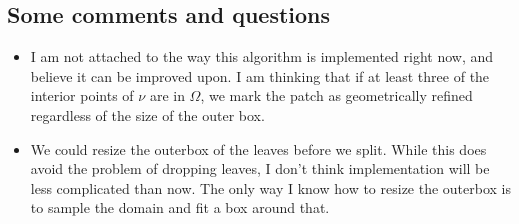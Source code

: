 \documentclass{article}
\begin{document}
\subsection{Some comments and questions}
\begin{itemize}
\item I am not attached to the way this algorithm is implemented right now, and believe it can be improved upon. I am thinking that if at least three of the interior points of $\nu$ are in $\Omega$, we mark the patch as geometrically refined regardless of the size of the outer box.
\item We could resize the outerbox of the leaves before we split. While this does avoid the problem of dropping leaves, I don't think implementation will be less complicated than now. The only way I know how to resize the outerbox is to sample the domain and fit a box around that.
\end{itemize}


\end{document}
